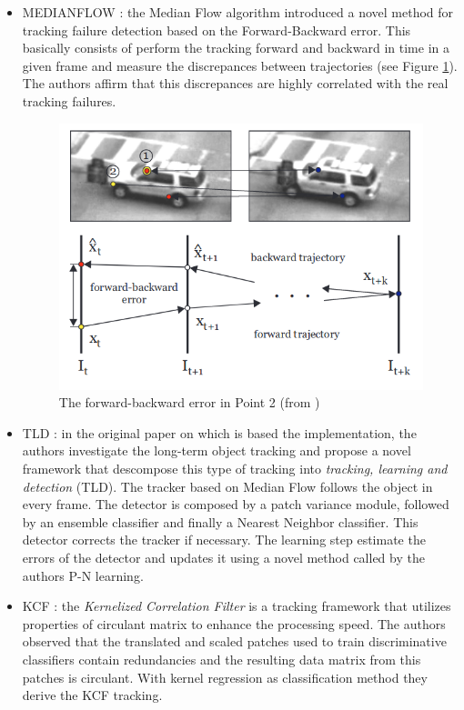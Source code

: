 \begin{itemize}
\item MEDIANFLOW \cite{kalal2010forward}: the Median Flow algorithm introduced a novel method for tracking failure detection based on the Forward-Backward error. This  basically consists of perform the tracking forward and backward in time in a given frame and measure the discrepances between trajectories (see Figure \ref{fig:medianflow}). The authors affirm that this discrepances are highly correlated with the real tracking failures.
\begin{figure}[H]
\begin{center}
\includegraphics[scale=0.4]{figures/medianflow.png}
\caption{The forward-backward error in Point 2 (from \cite{kalal2010forward})}
\label{fig:medianflow}
\end{center}
\end{figure}    
\item TLD \cite{kalal2011tracking}: in the original paper on which is based the implementation, the authors investigate the long-term object tracking and propose a novel framework that descompose this type of tracking into \textit{tracking, learning and detection} (TLD). The tracker based on Median Flow follows the object in every frame. The detector is composed by a patch variance module, followed by an ensemble classifier and finally a Nearest Neighbor classifier. This detector corrects the tracker if necessary. The learning step estimate the errors of the detector and updates it using a novel method called by the authors P-N learning.
\item KCF \cite{henriques2012exploiting}: the \textit{Kernelized Correlation Filter} is a tracking framework that utilizes properties of circulant matrix to enhance the processing speed. The authors observed that the translated and scaled patches used to train discriminative classifiers contain redundancies and the resulting data matrix from this patches is circulant. With kernel regression as classification method they derive the KCF tracking.

\end{itemize}
